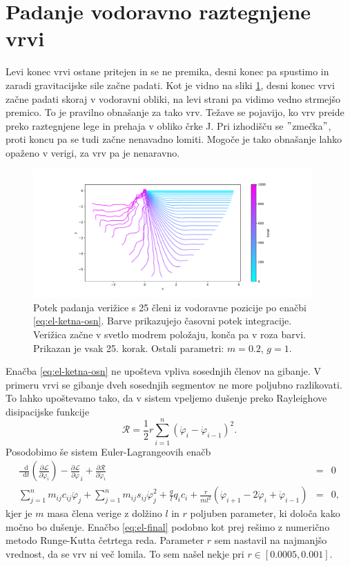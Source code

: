 \documentclass[a4paper, 12pt, slovene]{article}
\newcommand*\diff{\mathop{}\!\mathrm{d}}
\numberwithin{equation}{section}
\newcommand{\pd}{\partial}
\newcommand{\Lag}{\mathcal{L}}
\begin{document}
\section{Padanje vodoravno raztegnjene vrvi}
Levi konec vrvi ostane pritejen in se ne premika, desni konec pa spustimo in zaradi gravitacijske sile začne padati. Kot je vidno na sliki \ref{f:padanje-zac}, desni konec vrvi začne padati skoraj v vodoravni obliki, na levi strani pa vidimo vedno strmejšo premico. To je pravilno obnašanje za tako vrv. Težave se pojavijo, ko vrv preide preko raztegnjene lege in prehaja v obliko črke J. Pri izhodišču se $"$zmečka$"$, proti koncu pa se tudi začne nenavadno lomiti. Mogoče je tako obnašanje lahko opaženo v verigi, za vrv pa je nenaravno.

\begin{figure}[H]
\centering
\includegraphics[width=0.95\textwidth]{grafi/padvrv-n25-l0.24-dt0.01-t10.0-freq25.pdf}
\caption{Potek padanja verižice s 25 členi iz vodoravne pozicije po enačbi \eqref{eq:el-ketna-osn}. Barve prikazujejo časovni potek integracije. Verižica začne v svetlo modrem položaju, konča pa v roza barvi. Prikazan je vsak 25. korak. Ostali parametri: $m=0.2$, $g=1$.}
\label{f:padanje-zac}
\end{figure}

Enačba \eqref{eq:el-ketna-osn} ne upošteva vpliva sosednjih členov na gibanje. V primeru vrvi se gibanje dveh sosednjih segmentov ne more poljubno razlikovati. To lahko upoštevamo tako, da v sistem vpeljemo dušenje preko Rayleighove disipacijske funkcije \cite{tomazevski}
\begin{equation}
\mathcal{R} = \frac{1}{2}r\sum_{i=1}^n\left(\dot{\varphi}_i - \dot{\varphi}_{i-1}\right)^2.
\end{equation}
Posodobimo še sistem Euler-Lagrangeovih enačb
\begin{eqnarray}
\frac{\diff }{\diff t}\left(\frac{\pd\Lag}{\pd\dot{\varphi}_i}\right) - \frac{\pd\Lag}{\pd\varphi}_i + \frac{\pd\mathcal{R}}{\pd\dot{\varphi}_i}&=& 0 \\
\sum_{j=1}^n m_{ij}c_{ij}\ddot{\varphi}_j + \sum_{j=1}^n m_{ij}s_{ij}\dot{\varphi}_j^2 + \frac{g}{l}q_ic_i + \frac{r}{ml^2} \left(\dot{\varphi}_{i+1} - 2\dot{\varphi}_i + \dot{\varphi}_{i-1} \right) &=& 0,
\label{eq:el-final}
\end{eqnarray}
kjer je $m$ masa člena verige z dolžino $l$ in $r$ poljuben parameter, ki določa kako močno bo dušenje. Enačbo \eqref{eq:el-final} podobno kot prej rešimo z numerično metodo Runge-Kutta četrtega reda. Parameter $r$ sem nastavil na najmanjšo vrednost, da se vrv ni več lomila. To sem našel nekje pri $r\in[0.0005, 0.001]$.
\end{document}
